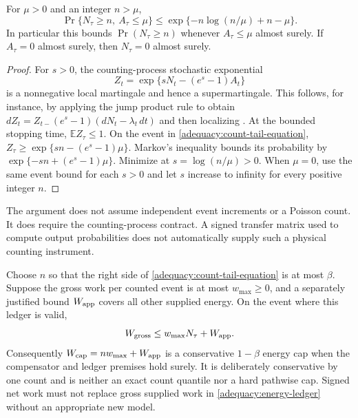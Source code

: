 \begin{theorem}
\label{adequacy:count-tail}
For $\mu>0$ and an integer $n>\mu$,
\begin{equation}
 \Pr\{N_\tau\geq n,\ A_\tau\leq\mu\}
 \leq \exp\{-n\log(n/\mu)+n-\mu\}.
 \label{adequacy:count-tail-equation}
\end{equation}
In particular this bounds $\Pr(N_\tau\geq n)$ whenever
$A_\tau\leq\mu$ almost surely. If $A_\tau=0$ almost surely, then
$N_\tau=0$ almost surely.
\end{theorem}
\begin{proof}
For $s>0$, the counting-process stochastic exponential
\[
 Z_t=\exp\{sN_t-(e^s-1)A_t\}
\]
is a nonnegative local martingale and hence a supermartingale. This follows,
for instance, by applying the jump product rule to obtain
$dZ_t=Z_{t-}(e^s-1)(dN_t-\lambda_t\,dt)$ and then localizing
\cite{caBremaud1981}. At the bounded stopping time,
$\mathbb E Z_\tau\leq1$. On the event in
\eqref{adequacy:count-tail-equation},
$Z_\tau\geq\exp\{sn-(e^s-1)\mu\}$. Markov's inequality bounds its
probability by $\exp\{-sn+(e^s-1)\mu\}$. Minimize at
$s=\log(n/\mu)>0$. When $\mu=0$, use the same event bound for each $s>0$
and let $s$ increase to infinity for every positive integer $n$.
\end{proof}

The argument does not assume independent event increments or a Poisson count.
It does require the counting-process contract. A signed transfer matrix used
to compute output probabilities does not automatically supply such a physical
counting instrument.

Choose $n$ so that the right side of
\eqref{adequacy:count-tail-equation} is at most $\beta$. Suppose the gross work
per counted event is at most $w_{\max}\geq0$, and a separately justified bound
$W_{\rm app}$ covers all other supplied energy. On the event where this ledger
is valid,
\begin{equation}
 W_{\rm gross}\leq w_{\max}N_\tau+W_{\rm app}.
 \label{adequacy:energy-ledger}
\end{equation}
Consequently $W_{\rm cap}=nw_{\max}+W_{\rm app}$ is a conservative
$1-\beta$ energy cap when the compensator and ledger premises hold surely.
It is deliberately conservative by one count and is neither an exact count
quantile nor a hard pathwise cap. Signed net work must not replace gross
supplied work in \eqref{adequacy:energy-ledger} without an appropriate new model.

